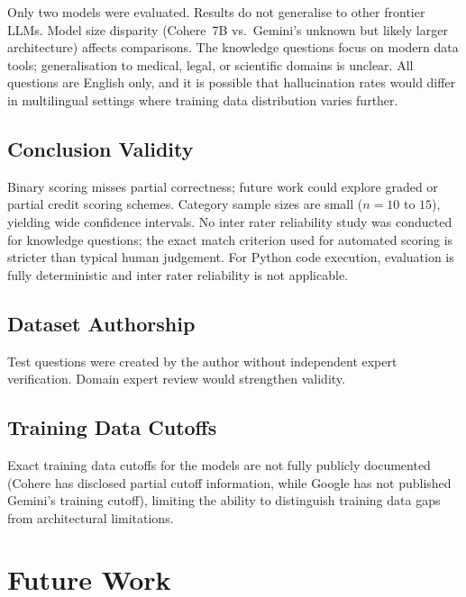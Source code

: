\documentclass[12pt,a4paper]{article}
\begin{document}
Only two models were evaluated. Results do not generalise to other frontier LLMs. Model size disparity (Cohere~7B vs.\ Gemini's unknown but likely larger architecture) affects comparisons. The knowledge questions focus on modern data tools; generalisation to medical, legal, or scientific domains is unclear. All questions are English only, and it is possible that hallucination rates would differ in multilingual settings where training data distribution varies further.

\subsection{Conclusion Validity}

Binary scoring misses partial correctness; future work could explore graded or partial credit scoring schemes. Category sample sizes are small ($n=10$ to $15$), yielding wide confidence intervals. No inter rater reliability study was conducted for knowledge questions; the exact match criterion used for automated scoring is stricter than typical human judgement. For Python code execution, evaluation is fully deterministic and inter rater reliability is not applicable.

\subsection{Dataset Authorship}

Test questions were created by the author without independent expert verification. Domain expert review would strengthen validity.

\subsection{Training Data Cutoffs}

Exact training data cutoffs for the models are not fully publicly documented (Cohere has disclosed partial cutoff information, while Google has not published Gemini's training cutoff), limiting the ability to distinguish training data gaps from architectural limitations.

\section{Future Work}
\end{document}
